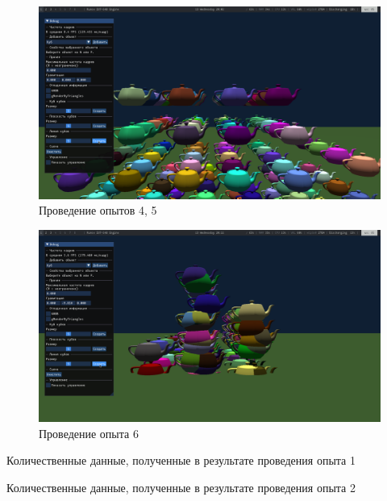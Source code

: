 \begin{figure}[H]
	\centering
    \includegraphics[width=\textwidth]{img/teapot-static.png}
	\caption{Проведение опытов 4, 5}
	\label{fig:ts}
\end{figure}

\begin{figure}[H]
	\centering
    \includegraphics[width=\textwidth]{img/teapot-collision.png}
	\caption{Проведение опыта 6}
	\label{fig:tc}
\end{figure}

\begin{table}[H]
    \caption{Количественные данные, полученные в результате проведения опыта 1}
    \label{tab:test1}
    \begin{adjustbox}{width=1\textwidth}
        
    \end{adjustbox}
\end{table}

\begin{table}[H]
    \caption{Количественные данные, полученные в результате проведения опыта 2}
    \label{tab:test2}
    \begin{adjustbox}{width=1\textwidth}
        
    \end{adjustbox}
\end{table}


